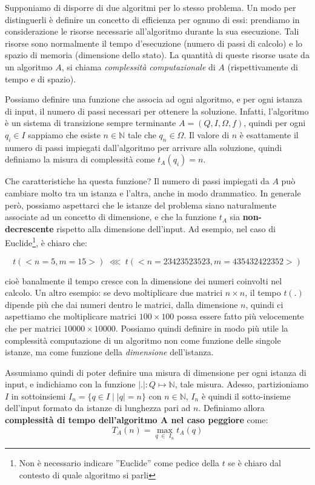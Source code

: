 Supponiamo di disporre di due algoritmi per lo stesso problema. Un
modo per distinguerli è definire un concetto di efficienza per ognuno
di essi: prendiamo in considerazione le risorse necessarie
all'algoritmo durante la sua esecuzione. Tali risorse sono normalmente
il tempo d'esecuzione (numero di passi di calcolo) e lo spazio di
memoria (dimensione dello stato). La quantità di queste risorse usate
da un algoritmo $A$, si chiama \emph{complessità computazionale} di
$A$ (rispettivamente di tempo e di spazio).

Possiamo definire una funzione che associa ad ogni algoritmo, e per
ogni istanza di input, il numero di passi necessari per ottenere la
soluzione. Infatti, l'algoritmo è un sistema di transizione sempre
terminante $A = (Q,I,\Omega,f)$, quindi per ogni $q_i \in I$ sappiamo
che esiste $n \in \mathbb{N}$ tale che $q_n \in \Omega$. Il valore di $n$ è
esattamente il numero di passi impiegati dall'algoritmo per arrivare
alla soluzione, quindi definiamo la misura di complessità come
$t_A(q_i) = n$.

Che caratteristiche ha questa funzione? Il numero di passi impiegati
da $A$ può cambiare molto tra un istanza e l'altra, anche in modo
drammatico. In generale però, possiamo aspettarci che le istanze del
problema siano naturalmente associate ad un concetto di dimensione, e
che la funzione $t_A$ sia \textbf{non-decrescente} rispetto alla
dimensione dell'input. Ad esempio, nel caso di Euclide\footnote{Non è
  necessario indicare ''Euclide'' come pedice della $t$ se è chiaro
  dal contesto di quale algoritmo si parli}, è chiaro che:

\[ t(<n=5,m=15>) \; \lll \; t(<n=23423523523,m=435432422352>) \]

cioè banalmente il tempo cresce con la dimensione dei numeri coinvolti
nel calcolo. Un altro esempio: se devo moltiplicare due matrici $n
\times n$, il tempo $t(.)$ dipende più che dai numeri dentro le
matrici, dalla dimensione $n$, quindi ci aspettiamo che moltiplicare
matrici $100 \times 100$ possa essere fatto più velocemente che per
matrici $10000 \times 10000$. Possiamo quindi definire in modo più
utile la complessità computazione di un algoritmo non come funzione
delle singole istanze, ma come funzione della \emph{dimensione}
dell'istanza.

Assumiamo quindi di poter definire una misura di dimensione per ogni
istanza di input, e indichiamo con la funzione $|.| : Q \mapsto
\mathbb{N}$, tale misura. Adesso, partizioniamo $I$ in sottoinsiemi
$I_n = \{ q \in I \;|\; |q|=n \}$ con $n\in \mathbb{N}$, $I_n$ è
quindi il sotto-insieme dell'input formato da istanze di lunghezza
pari ad $n$. Definiamo allora \textbf{complessità di tempo
  dell'algoritmo A nel caso peggiore} come:
\[ T_A(n) = \max_{q\; \in\; I_n} t_A(q) \]

